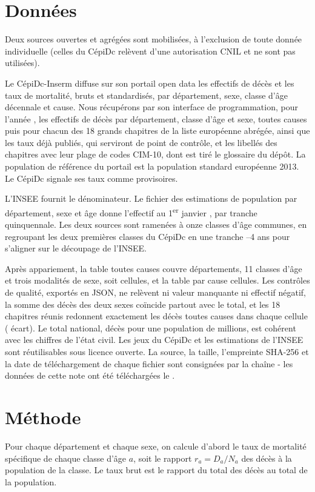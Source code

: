 \documentclass[11pt,a4paper]{article}
\begin{document}
\section{Données}
Deux sources ouvertes et agrégées sont mobilisées, à l'exclusion de toute donnée
individuelle (celles du CépiDc relèvent d'une autorisation CNIL et ne sont pas
utilisées).

Le CépiDc-Inserm diffuse sur son portail open data les effectifs de décès et les
taux de mortalité, bruts et standardisés, par département, sexe, classe d'âge
décennale et cause. Nous récupérons par son interface de programmation, pour
l'année \annee, les effectifs de décès par département, classe d'âge et sexe,
toutes causes puis pour chacun des 18 grands chapitres de la liste européenne
abrégée, ainsi que les taux déjà publiés, qui serviront de point de contrôle, et
les libellés des chapitres avec leur plage de codes CIM-10, dont est tiré le
glossaire du dépôt. La population de référence du portail est la population
standard européenne 2013. Le CépiDc signale ses taux \annee{} comme provisoires.

L'INSEE fournit le dénominateur. Le fichier des estimations de population par
département, sexe et âge donne l'effectif au 1\textsuperscript{er} janvier
\annee, par tranche quinquennale. Les deux sources sont ramenées à onze classes
d'âge communes, en regroupant les deux premières classes du CépiDc en une
tranche --4 ans \fg{} pour s'aligner sur le découpage de l'INSEE.

Après appariement, la table toutes causes couvre \nDep{} départements, 11 classes
d'âge et trois modalités de sexe, soit \nCellules{} cellules, et la table par
cause \nCellulesCauses{} cellules. Les contrôles de qualité, exportés en JSON, ne
relèvent ni valeur manquante ni effectif négatif, la somme des décès des deux
sexes coïncide partout avec le total, et les 18 chapitres réunis redonnent
exactement les décès toutes causes dans chaque cellule (\ecartChapitres{} écart).
Le total national, \decesTotal{} décès pour une population de \popTotal{}
millions, est cohérent avec les chiffres de l'état civil. Les jeux du CépiDc et
les estimations de l'INSEE sont réutilisables sous licence ouverte. La source, la
taille, l'empreinte SHA-256 et la date de téléchargement de chaque fichier sont
consignées par la chaîne - les données de cette note ont été téléchargées le
\dateDonnees.

\section{Méthode}
Pour chaque département et chaque sexe, on calcule d'abord le taux de mortalité
spécifique de chaque classe d'âge $a$, soit le rapport $r_a = D_a / N_a$ des
décès à la population de la classe. Le taux brut est le rapport du total des
décès au total de la population.
\end{document}
